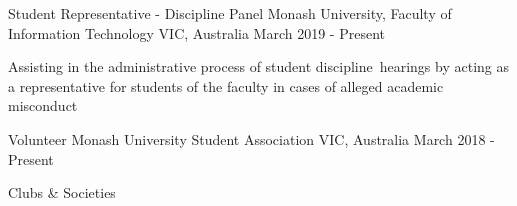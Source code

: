 

\begin{cventries}


  \cventry
    {Student Representative - Discipline Panel} %
    {Monash University, Faculty of Information Technology} %
    {VIC, Australia} %
    {March 2019 - Present} %
    {
      \begin{cvitems} %
        \item {Assisting in the administrative process of student discipline hearings by acting as a representative for students of the faculty in cases of alleged academic misconduct}
      \end{cvitems}
    }

  \cventry
    {Volunteer} %
    {Monash University Student Association} %
    {VIC, Australia} %
    {March 2018 - Present} %
    {
      \begin{cvitems} 
      \end{cvitems}
    }

  \vspace*{-4mm}
  \cventry
    {} %
    {Clubs \& Societies} %
    {} %
    {} %
    {
      \begin{cvitems} 
      \end{cvitems}
    }
    

\end{cventries}
